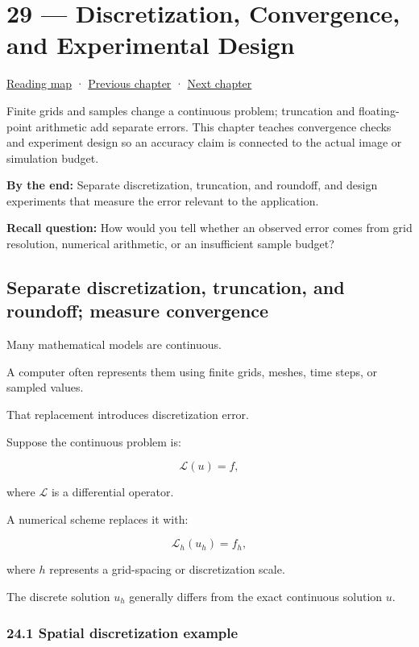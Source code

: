 \hypertarget{02-foundations-ii-ch029}{}
\section{29 --- Discretization, Convergence, and Experimental Design}\label{discretization-convergence-and-experimental-design}

\href{Chapter\%20Edition/01\%20-\%20Computing\%20Foundations/00\%20-\%20Reading\%20Map}{Reading map} · \hyperref[02-foundations-ii-ch028]{Previous chapter} · \hyperref[02-foundations-ii-ch030]{Next chapter}

Finite grids and samples change a continuous problem; truncation and floating-point arithmetic add separate errors. This chapter teaches convergence checks and experiment design so an accuracy claim is connected to the actual image or simulation budget.

\textbf{By the end:} Separate discretization, truncation, and roundoff, and design experiments that measure the error relevant to the application.

\textbf{Recall question:} How would you tell whether an observed error comes from grid resolution, numerical arithmetic, or an insufficient sample budget?

\subsection{Separate discretization, truncation, and roundoff; measure convergence}\label{separate-discretization-truncation-and-roundoff-measure-convergence}

Many mathematical models are continuous.

A computer often represents them using finite grids, meshes, time steps, or sampled values.

That replacement introduces discretization error.

Suppose the continuous problem is:

\[ \mathcal L(u)=f, \]

where \(\mathcal L\) is a differential operator.

A numerical scheme replaces it with:

\[ \mathcal L_h(u_h)=f_h, \]

where \(h\) represents a grid-spacing or discretization scale.

The discrete solution \(u_h\) generally differs from the exact continuous solution \(u\).

\subsubsection{24.1 Spatial discretization example}\label{spatial-discretization-example}

